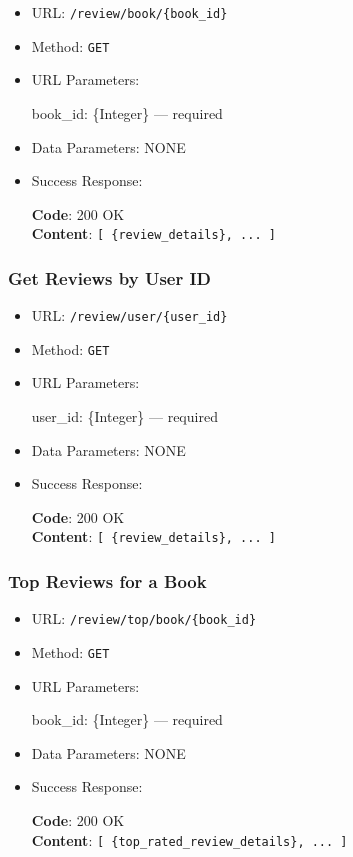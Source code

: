 \begin{itemize}
    \item URL: \texttt{/review/book/\{book\_id\}}
    \item Method: \texttt{GET}
    \item URL Parameters:

    book\_id: \{Integer\} — required

    \item Data Parameters: NONE

    \item Success Response: \newline

    \textbf{Code}: 200 OK \\
    \textbf{Content}: \texttt{[ \{review\_details\}, ... ]}
\end{itemize}

\subsubsection*{Get Reviews by User ID}

\begin{itemize}
    \item URL: \texttt{/review/user/\{user\_id\}}
    \item Method: \texttt{GET}
    \item URL Parameters:

    user\_id: \{Integer\} — required

    \item Data Parameters: NONE

    \item Success Response: \newline

    \textbf{Code}: 200 OK \\
    \textbf{Content}: \texttt{[ \{review\_details\}, ... ]}
\end{itemize}

\subsubsection*{Top Reviews for a Book}

\begin{itemize}
    \item URL: \texttt{/review/top/book/\{book\_id\}}
    \item Method: \texttt{GET}
    \item URL Parameters:

    book\_id: \{Integer\} — required

    \item Data Parameters: NONE

    \item Success Response: \newline

    \textbf{Code}: 200 OK \\
    \textbf{Content}: \texttt{[ \{top\_rated\_review\_details\}, ... ]}
\end{itemize}

